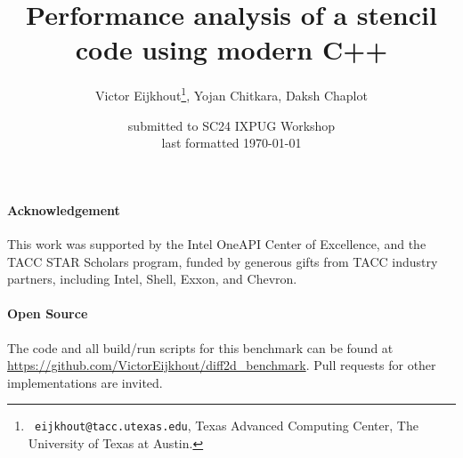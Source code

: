 \documentclass[11pt,fleqn]{IEEEtran}
\begin{document}
\title{Performance analysis of a stencil code using modern C++}
\author{Victor Eijkhout\thanks{{\tt
      eijkhout@tacc.utexas.edu}, Texas Advanced Computing Center, The
    University of Texas at Austin.
  }, Yojan Chitkara, Daksh Chaplot}
\date{submitted to SC24 IXPUG Workshop\\ last formatted \today}
\maketitle



\paragraph*{Acknowledgement}
This work was supported by
the Intel OneAPI Center of Excellence, and the 
TACC STAR Scholars program,
funded by generous gifts from TACC industry partners, including Intel, Shell, Exxon, and Chevron.

\paragraph*{Open Source}
The code and all build/run scripts for this benchmark
can be found at
\url{https://github.com/VictorEijkhout/diff2d_benchmark}.
Pull requests for other implementations
are invited.



\end{document}
